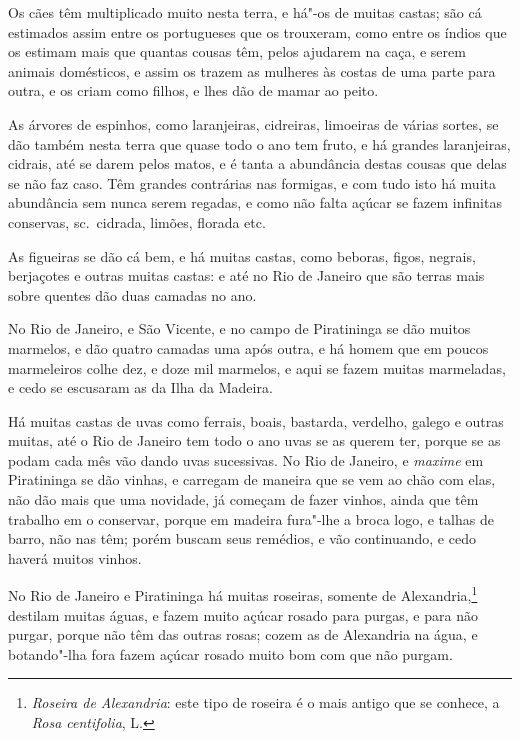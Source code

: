  Os cães têm multiplicado muito nesta terra, e há"-os de
muitas castas; são cá estimados assim entre os portugueses que os
trouxeram, como entre os índios que os estimam mais que quantas cousas
têm, pelos ajudarem na caça, e serem animais domésticos, e assim os
trazem as mulheres às costas de uma parte para outra, e os criam como
filhos, e lhes dão de mamar ao peito. 

 As árvores de espinhos, como laranjeiras, cidreiras,
limoeiras de várias sortes, se dão também nesta terra que quase todo o
ano tem fruto, e há grandes laranjeiras, cidrais, até se darem pelos
matos, e é tanta a abundância destas cousas que delas se não faz caso.
Têm grandes contrárias nas formigas, e com tudo isto há muita
abundância sem nunca serem regadas, e como não falta açúcar se fazem
infinitas conservas, sc.~cidrada, limões, florada etc.

 As figueiras se dão cá bem, e há muitas castas,
como beboras, figos, negrais, berjaçotes e outras muitas castas: e até
no Rio de Janeiro que são terras mais sobre quentes dão duas camadas no ano.

 No Rio de Janeiro, e São Vicente, e no campo de
Piratininga se dão muitos marmelos, e dão quatro camadas uma após
outra, e há homem que em poucos marmeleiros colhe dez, e doze mil
marmelos, e aqui se fazem muitas marmeladas, e cedo se escusaram as da
Ilha da Madeira.

 Há muitas castas de uvas como ferrais, boais,
bastarda, verdelho, galego e outras muitas, até o Rio de Janeiro tem
todo o ano uvas se as querem ter, porque se as podam cada mês vão dando
uvas sucessivas. No Rio de Janeiro, e \textit{maxime} em Piratininga se dão
vinhas, e carregam de maneira que se vem ao chão com elas, não dão mais
que uma novidade, já começam de fazer vinhos, ainda que têm trabalho em
o conservar, porque em madeira fura"-lhe a broca logo, e talhas de
barro, não nas têm; porém buscam seus remédios, e vão continuando, e
cedo haverá muitos vinhos.

 No Rio de Janeiro e Piratininga há muitas roseiras,
somente de Alexandria,\footnote{ \textit{Roseira de Alexandria}: este
tipo de roseira é o mais antigo que se conhece, a \textit{Rosa
centifolia}, L.} destilam muitas águas, e fazem muito açúcar rosado
para purgas, e para não purgar, porque não têm das outras rosas; cozem
as de Alexandria na água, e botando"-lha fora fazem açúcar rosado muito
bom com que não purgam.

